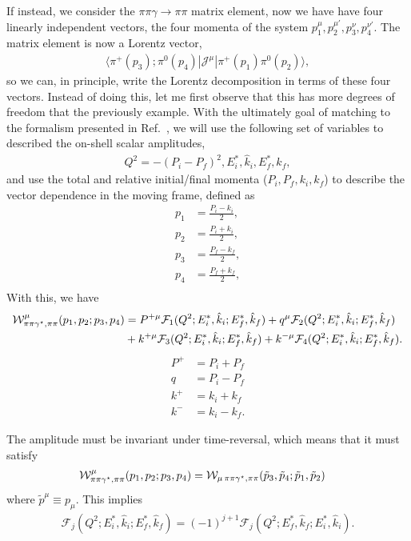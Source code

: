 If instead, we consider the $\pi\pi\gamma\to\pi\pi$ matrix element, now we have have four linearly independent vectors, the four momenta of the system $p^{\mu}_{1},p^{\mu'}_{2},p^{\nu}_{3},p^{\nu'}_{4}$. The matrix element is now a Lorentz vector,
\begin{align}
\langle\pi^+(p_3);\pi^0(p_4)|{\mathcal{J}}^{\mu}|\pi^+(p_1)\pi^0(p_2)\rangle,
\end{align}
so we can, in principle, write the Lorentz decomposition in terms of these four vectors. Instead of doing this, let me first observe that this has more degrees of freedom that the previously example. With the ultimately goal of matching to the formalism presented in Ref.~\cite{Briceno:2015tza}, we will use the following set of variables to described the on-shell scalar amplitudes,
\begin{align}
Q^2=-(P_i-P_f)^2,E_i^*,\hat{k}_i,E_f^*,\hat{k}_f,
\end{align} 
and use the total and relative initial/final momenta ($P_i,P_f,k_i,k_f$) to describe the vector dependence in the moving frame, defined as
\begin{align}
p_1&=\frac{P_i-k_i}{2},\\
p_2&=\frac{P_i+k_i}{2},\\
p_3&=\frac{P_f-k_f}{2},\\
p_4&=\frac{P_f+k_f}{2},\\
\end{align}
With this, we have
\begin{align}
{\mathcal{W}}^{\mu}_{\pi\pi\gamma^\star,\pi\pi}(p_1,p_2;p_3,p_4)&=
P^{+\mu}\mathcal{F}_{1}(Q^2;E_i^*,\hat{k}_i;E_f^*,\hat{k}_f)
+
q^{\mu}\mathcal{F}_{2}(Q^2;E_i^*,\hat{k}_i;E_f^*,\hat{k}_f)
\nonumber\\
&+
k^{+\mu}\mathcal{F}_{3}(Q^2;E_i^*,\hat{k}_i;E_f^*,\hat{k}_f)
+
k^{-\mu}\mathcal{F}_{4}(Q^2;E_i^*,\hat{k}_i;E_f^*,\hat{k}_f).
\end{align}
\begin{align}
P^+&=P_i+P_f\\
q&=P_i-P_f\\
k^+&=k_i+k_f\\
k^-&=k_i-k_f.
\end{align}

The amplitude must be invariant under time-reversal, which means that it must satisfy
\begin{align}
{\mathcal{W}}^{\mu}_{\pi\pi\gamma^\star,\pi\pi}(p_1,p_2;p_3,p_4)&=
{\mathcal{W}}_{\mu\,\pi\pi\gamma^\star,\pi\pi}(\tilde{p}_3,\tilde{p}_4;\tilde{p}_1,\tilde{p}_2)
\end{align}
where $\tilde{p}^\mu\equiv {p}_\mu$. This implies
\begin{align}
\mathcal{F}_{j}(Q^2;E_i^*,\hat{k}_i;E_f^*,\hat{k}_f)
=(-1)^{j+1}\mathcal{F}_{j}(Q^2;E_f^*,\hat{k}_f;E_i^*,\hat{k}_i).
\end{align}

